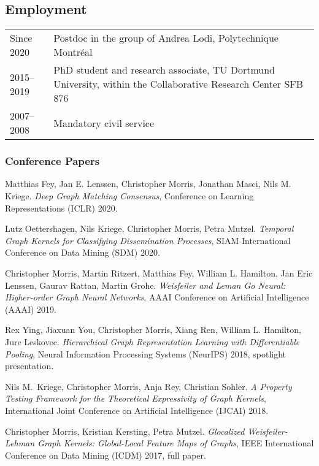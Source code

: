 \documentclass[11pt, a4paper]{scrartcl}
\begin{document}
\subsection*{Employment}
\begin{tabular}{p{2.1cm}p{12.0cm}}
	Since 2020& Postdoc in the group of Andrea Lodi, Polytechnique Montréal\\
	2015--2019&PhD student and research associate, TU Dortmund University, within the Collaborative Research Center SFB 876\\
	2007--2008&Mandatory civil service\\
\end{tabular}

\renewcommand{\refname}{\large\bfseries Publications}

\begin{thebibliography}{5}
\subsubsection*{Conference Papers}
	Matthias Fey, Jan E. Lenssen, Christopher Morris, Jonathan Masci, Nils M. Kriege.
    \emph{Deep Graph Matching Consensus},
	Conference on Learning Representations (ICLR) 2020.
	
	Lutz Oettershagen, Nils Kriege, Christopher Morris, Petra Mutzel.
	\emph{Temporal Graph Kernels for Classifying Dissemination Processes},
	SIAM International Conference on Data Mining (SDM) 2020.
	
	Christopher Morris, Martin Ritzert, Matthias Fey, William L. Hamilton, Jan Eric Lenssen, Gaurav Rattan, Martin Grohe.
	\newblock \emph{Weisfeiler and Leman Go Neural: Higher-order Graph Neural Networks},
	\newblock AAAI Conference on Artificial Intelligence (AAAI) 2019.
	
	Rex Ying, Jiaxuan You, Christopher Morris, Xiang Ren, William L. Hamilton, Jure Leskovec.
	\emph{Hierarchical Graph Representation Learning with Differentiable Pooling},
	Neural Information Processing Systems (NeurIPS) 2018, spotlight presentation.
	
	Nils M.~Kriege, Christopher Morris, Anja Rey, Christian Sohler.
	\emph{A Property Testing Framework for the Theoretical Expressivity of Graph Kernels},
	International Joint Conference on Artificial Intelligence (IJCAI) 2018.
	
    Christopher Morris, Kristian Kersting, Petra Mutzel.
	\emph{Glocalized Weisfeiler-Lehman Graph Kernels: Global-Local Feature Maps of Graphs},
	IEEE International Conference on Data Mining (ICDM) 2017, full paper.
	

\end{thebibliography}
\end{document}
